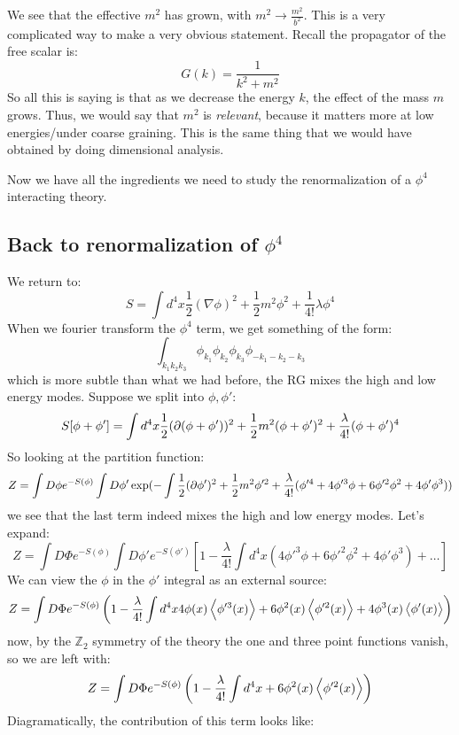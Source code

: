 We see that the effective $m^2$ has grown, with $m^2 \to \frac{m^2}{b^2}$. This is a very complicated way to make a very obvious statement. Recall the propagator of the free scalar is:
\begin{equation}
    G(k) = \frac{1}{k^2 + m^2}
\end{equation}
So all this is saying is that as we decrease the energy $k$, the effect of the mass $m$ grows. Thus, we would say that $m^2$ is \emph{relevant}, because it matters more at low energies/under coarse graining. This is the same thing that we would have obtained by doing dimensional analysis.

Now we have all the ingredients we need to study the renormalization of a $\phi^4$ interacting theory.

\subsection{Back to renormalization of $\phi^4$}
We return to:
\begin{equation}
    S = \int d^4x \frac{1}{2}(\nabla \phi)^2 + \frac{1}{2}m^2 \phi^2 + \frac{1}{4!}\lambda\phi^4
\end{equation}
When we fourier transform the $\phi^4$ term, we get something of the form:
\begin{equation}
    \int_{k_1k_2k_3}\phi_{k_1}\phi_{k_2}\phi_{k_3}\phi_{-k_1-k_2-k_3}
\end{equation}
which is more subtle than what we had before, the RG mixes the high and low energy modes. Suppose we split into $\phi, \phi'$:
\begin{equation}
    S[\phi + \phi'] = \int d^4x \frac{1}{2}(\partial(\phi + \phi'))^2 + \frac{1}{2}m^2(\phi + \phi')^2 + \frac{\lambda}{4!}(\phi + \phi')^4
\end{equation}
So looking at the partition function:
\begin{equation}
    Z = \int D\phi e^{-S(\phi)}\int D\phi' \exp(-\int \frac{1}{2}(\partial\phi')^2 + \frac{1}{2}m^2\phi'^2 + \frac{\lambda}{4!}(\phi'^4 + 4\phi'^3\phi + 6\phi'^2\phi^2 + 4\phi'\phi^3))
\end{equation}
we see that the last term indeed mixes the high and low energy modes. Let's expand:
\begin{equation}
    Z = \int D\Phi e^{-S(\phi)}\int D\phi' e^{-S(\phi')} [1 - \frac{\lambda}{4!}\int d^4x (4\phi'^3\phi + 6\phi'^2\phi^2 + 4\phi'\phi^3) + \ldots]
\end{equation}
We can view the $\phi$ in the $\phi'$ integral as an external source:
\begin{equation}
    Z = \int D\Phi e^{-S(\phi)}\left(1 - \frac{\lambda}{4!}\int d^4x 4\phi(x)\left< \phi'^3(x) \right> + 6\phi^2(x)\left< \phi'^2(x) \right> + 4\phi^3(x)\left< \phi'(x) \right>\right)
\end{equation}
now, by the $\mathbb{Z}_2$ symmetry of the theory the one and three point functions vanish, so we are left with:
\begin{equation}
    Z = \int D\Phi e^{-S(\phi)}\left(1 - \frac{\lambda}{4!}\int d^4x + 6\phi^2(x)\left< \phi'^2(x) \right>\right)
\end{equation}
Diagramatically, the contribution of this term looks like:

